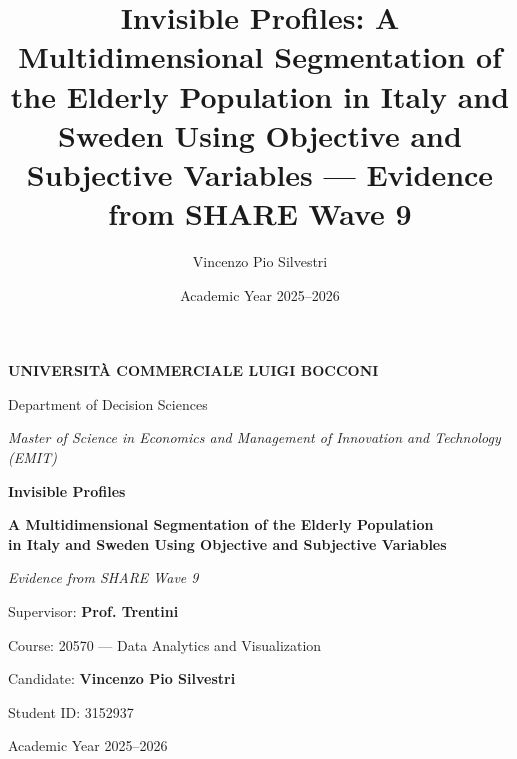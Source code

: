 \documentclass[12pt,a4paper,oneside]{report}
\title{Invisible Profiles: A Multidimensional Segmentation of the Elderly Population in Italy and Sweden Using Objective and Subjective Variables --- Evidence from SHARE Wave 9}
\author{Vincenzo Pio Silvestri}
\date{Academic Year 2025--2026}
\begin{document}
\begin{titlepage}
  \centering
  \vspace*{1.5cm}
  {\Large\bfseries UNIVERSIT\`A COMMERCIALE LUIGI BOCCONI\par}
  \vspace{0.6cm}
  {\large Department of Decision Sciences\par}
  \vspace{0.3cm}
  {\large \emph{Master of Science in Economics and Management of Innovation and Technology (EMIT)}\par}
  \vfill
  {\Huge\bfseries Invisible Profiles\par}
  \vspace{0.5cm}
  {\Large\bfseries A Multidimensional Segmentation of the Elderly Population\\
   in Italy and Sweden Using Objective and Subjective Variables\par}
  \vspace{0.4cm}
  {\large\itshape Evidence from SHARE Wave 9\par}
  \vfill
  \begin{flushleft}
    {\large Supervisor: \textbf{Prof. Trentini}\par}
    \vspace{0.2cm}
    {\large Course: 20570 --- Data Analytics and Visualization\par}
    \vspace{0.6cm}
    {\large Candidate: \textbf{Vincenzo Pio Silvestri}\par}
    \vspace{0.1cm}
    {\large Student ID: 3152937\par}
  \end{flushleft}
  \vfill
  {\large Academic Year 2025--2026\par}
\end{titlepage}

\tableofcontents
\listoftables
\listoffigures










\appendix


\printbibliography[heading=bibintoc, title={Bibliography}]
\end{document}
